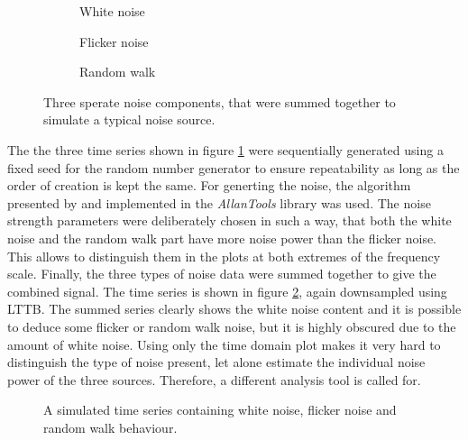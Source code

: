 \begin{figure}[ht]
    \centering
    \begin{subfigure}{0.32\linewidth}
        \centering
        \scalebox{0.75}{%
            
        } %
        \caption{White noise}
    \end{subfigure}
    \begin{subfigure}{0.32\linewidth}
        \centering
        \scalebox{0.75}{%
            
        } %
        \caption{Flicker noise}
    \end{subfigure}
    \begin{subfigure}{0.32\linewidth}
        \centering
        \scalebox{0.75}{%
            
        } %
        \caption{Random walk}
    \end{subfigure}
    \caption{Three sperate noise components, that were summed together to simulate a typical noise source.}
    \label{fig:adev_example_noise_types}
\end{figure}

The the three time series shown in figure \ref{fig:adev_example_noise_types} were sequentially generated using a fixed seed for the random number generator to ensure repeatability as long as the order of creation is kept the same. For generting the noise, the algorithm presented by \citeauthor{noise_generation} \cite{noise_generation} and implemented in the \textit{AllanTools} library was used. The noise strength parameters were deliberately chosen in such a way, that both the white noise and the random walk part have more noise power than the flicker noise. This allows to distinguish them in the plots at both extremes of the frequency scale. Finally, the three types of noise data were summed together to give the combined signal. The time series is shown in figure \ref{fig:adev_example_time}, again downsampled using LTTB. The summed series clearly shows the white noise content and it is possible to deduce some flicker or random walk noise, but it is highly obscured due to the amount of white noise. Using only the time domain plot makes it very hard to distinguish the type of noise present, let alone estimate the individual noise power of the three sources. Therefore, a different analysis tool is called for.

\begin{figure}[ht]
    \centering
    
    \caption{A simulated time series containing white noise, flicker noise and random walk behaviour.}
    \label{fig:adev_example_time}
\end{figure}

